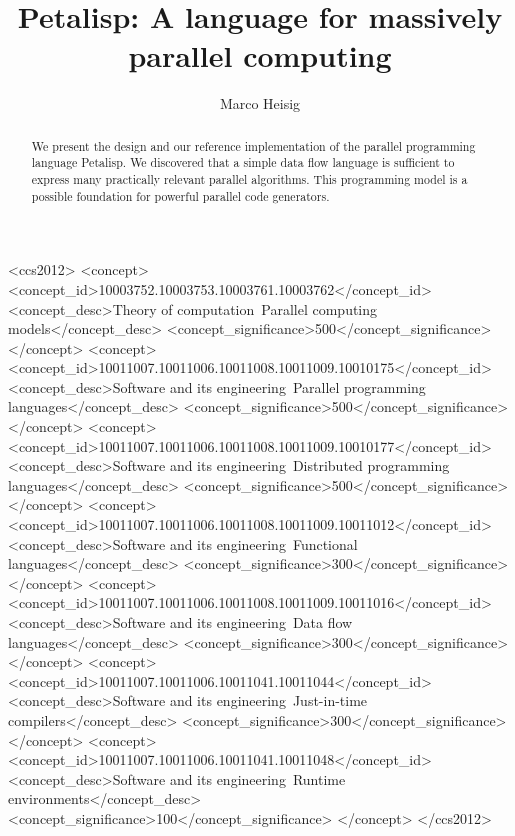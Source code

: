 \documentclass[sigconf]{acmart}
\theoremstyle{definition}
\begin{document}
\title{Petalisp: A language for massively parallel computing}

\author{Marco Heisig}

\begin{abstract}
  We present the design and our reference implementation of the parallel
  programming language Petalisp. We discovered that a simple data flow
  language is sufficient to express many practically relevant parallel
  algorithms. This programming model is a possible foundation for powerful
  parallel code generators.
\end{abstract}

\begin{CCSXML}
<ccs2012>
<concept>
<concept_id>10003752.10003753.10003761.10003762</concept_id>
<concept_desc>Theory of computation~Parallel computing models</concept_desc>
<concept_significance>500</concept_significance>
</concept>
<concept>
<concept_id>10011007.10011006.10011008.10011009.10010175</concept_id>
<concept_desc>Software and its engineering~Parallel programming languages</concept_desc>
<concept_significance>500</concept_significance>
</concept>
<concept>
<concept_id>10011007.10011006.10011008.10011009.10010177</concept_id>
<concept_desc>Software and its engineering~Distributed programming languages</concept_desc>
<concept_significance>500</concept_significance>
</concept>
<concept>
<concept_id>10011007.10011006.10011008.10011009.10011012</concept_id>
<concept_desc>Software and its engineering~Functional languages</concept_desc>
<concept_significance>300</concept_significance>
</concept>
<concept>
<concept_id>10011007.10011006.10011008.10011009.10011016</concept_id>
<concept_desc>Software and its engineering~Data flow languages</concept_desc>
<concept_significance>300</concept_significance>
</concept>
<concept>
<concept_id>10011007.10011006.10011041.10011044</concept_id>
<concept_desc>Software and its engineering~Just-in-time compilers</concept_desc>
<concept_significance>300</concept_significance>
</concept>
<concept>
<concept_id>10011007.10011006.10011041.10011048</concept_id>
<concept_desc>Software and its engineering~Runtime environments</concept_desc>
<concept_significance>100</concept_significance>
</concept>
</ccs2012>
\end{CCSXML}

\end{document}
